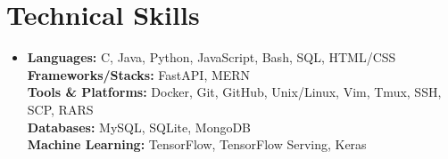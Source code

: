 \documentclass[letterpaper,11pt]{article}
\makeatletter
\newcommand{\resumeItem}[1]{
  \item\small{
    {#1 \vspace{2pt}}
  }
}
\newcommand{\resumeProjectHeading}[2]{
    \item
    \begin{tabular*}{1.001\textwidth}{l@{\extracolsep{\fill}}r}
      \small#1 & \textbf{\small #2}\\
    \end{tabular*}\vspace{-7pt}
}
\newcommand{\resumeSubHeadingListStart}{\begin{itemize}[leftmargin=0.0in, label={}]}
\newcommand{\resumeSubHeadingListEnd}{\end{itemize}}
\newcommand{\resumeItemListStart}{\begin{itemize}}
\newcommand{\resumeItemListEnd}{\end{itemize}\vspace{6pt}}
\makeatother
\begin{document}
%           


\section{Technical Skills}
\begin{itemize}[leftmargin=0.15in, label={}]
  \item[] \small{
    \textbf{Languages:} C, Java, Python, JavaScript, Bash, SQL, HTML/CSS \\
    \textbf{Frameworks/Stacks:} FastAPI, MERN \\
    \textbf{Tools \& Platforms:} Docker, Git, GitHub, Unix/Linux, Vim, Tmux, SSH, SCP, RARS \\
    \textbf{Databases:} MySQL, SQLite, MongoDB \\
    \textbf{Machine Learning:} TensorFlow, TensorFlow Serving, Keras
  }
\end{itemize}
\vspace{-10pt}
\end{document}
